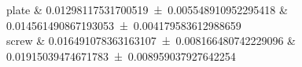 plate 		&		\num{0.01298117531700519 \pm 0.005548910952295418} 		&		\num{0.014561490867193053 \pm 0.004179583612988659}	 \\ 
screw 		&		\num{0.016491078363163107 \pm 0.008166480742229096} 		&		\num{0.01915039474671783 \pm 0.008959037927642254}	 \\ 

